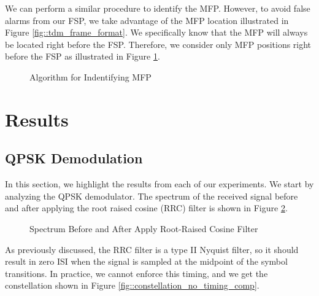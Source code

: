 \documentclass[conference,onecolumn]{IEEEtran}
\begin{document}
We can perform a similar procedure to identify the MFP. However, to avoid false alarms from our FSP, we take advantage of the MFP location illustrated in Figure \ref{fig::tdm_frame_format}. We specifically know that the MFP will always be located right before the FSP. Therefore, we consider only MFP positions right before the FSP as illustrated in Figure \ref{fig::finding_mfp}.

\begin{figure}[H]
	\centerline{}
	\caption{Algorithm for Indentifying MFP}
	\label{fig::finding_mfp}
\end{figure}

\section{Results}

\subsection{QPSK Demodulation}

In this section, we highlight the results from each of our experiments. We start by analyzing the QPSK demodulator. The spectrum of the received signal before and after applying the root raised cosine (RRC) filter is shown in Figure \ref{fig::root_raised_cosine_spectrum}.

\begin{figure}[H]
	\centerline{}
	\caption{Spectrum Before and After Apply Root-Raised Cosine Filter}
	\label{fig::root_raised_cosine_spectrum}
\end{figure}

\noindent As previously discussed, the RRC filter is a type II Nyquist filter, so it should result in zero ISI when the signal is sampled at the midpoint of the symbol transitions. In practice, we cannot enforce this timing, and we get the constellation shown in Figure \ref{fig::constellation_no_timing_comp}.
\end{document}
